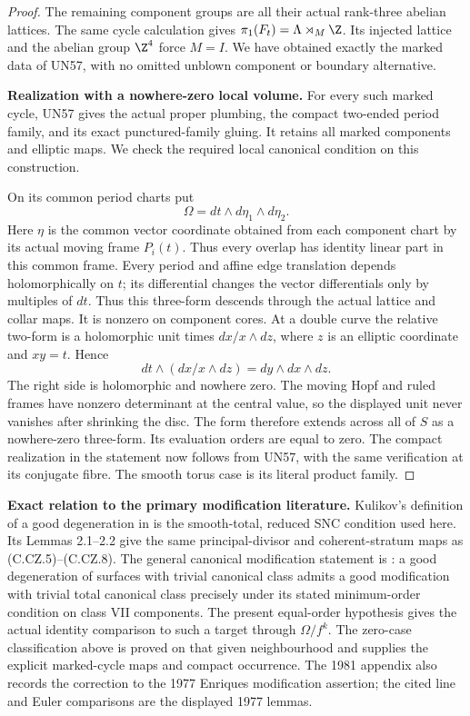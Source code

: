 \begin{proof}
The remaining component groups
are all their actual rank-three
abelian lattices. The same cycle
calculation gives
$\pi_1(F_t)=\Lambda\rtimes_M\Z$.
Its injected lattice and the
abelian group $\Z^4$ force
$M=I$. We have obtained exactly
the marked data of UN57, with
no omitted unblown component
or boundary alternative.

\par\medskip\noindent\textbf{Realization with a nowhere-zero local volume.}
For every such marked cycle,
UN57 gives the actual proper
plumbing, the compact two-ended
period family, and its exact
punctured-family gluing. It
retains all marked components
and elliptic maps. We check
the required local canonical
condition on this construction.

On its common period charts
put
\[
                       \Omega=dt\wedge d\eta_1\wedge d\eta_2.
\tag{C.CZ.13}
\]
Here $\eta$ is the common
vector coordinate obtained
from each component chart
by its actual moving frame
$P_i(t)$. Thus every overlap
has identity linear part in
this common frame.
Every period and affine edge
translation depends holomorphically
on $t$; its differential changes
the vector differentials only by
multiples of $dt$. Thus this
three-form descends through the
actual lattice and collar maps.
It is nonzero on component cores.
At a double curve the relative
two-form is a holomorphic unit
times $dx/x\wedge dz$, where
$z$ is an elliptic coordinate
and $xy=t$. Hence
\[
             dt\wedge(dx/x\wedge dz)
                               =dy\wedge dx\wedge dz.
\tag{C.CZ.14}
\]
The right side is holomorphic
and nowhere zero. The moving
Hopf and ruled frames have
nonzero determinant at the
central value, so the displayed
unit never vanishes after
shrinking the disc. The form
therefore extends across all
of $S$ as a nowhere-zero
three-form. Its evaluation
orders are equal to zero.
The compact realization in
the statement now follows
from UN57, with the same
verification at its conjugate
fibre. The smooth torus case
is its literal product family.
\end{proof}

\par\medskip\noindent\textbf{Exact relation to the primary modification literature.}
Kulikov's definition of a good degeneration in
\cite[p.~958]{Kulikov1977} is the smooth-total,
reduced SNC condition used here. Its Lemmas 2.1--2.2
give the same principal-divisor and coherent-stratum
maps as (C.CZ.5)--(C.CZ.8). The general canonical
modification statement is
\cite[Theorem 1$'$]{Kulikov1981}: a good degeneration
of surfaces with trivial canonical class admits a
good modification with trivial total canonical
class precisely under its stated minimum-order
condition on class VII components. The present
equal-order hypothesis gives the actual identity
comparison to such a target through $\Omega/f^k$.
The zero-case classification above is proved on
that given neighbourhood and supplies the explicit
marked-cycle maps and compact occurrence. The
1981 appendix also records the correction to the
1977 Enriques modification assertion; the cited
line and Euler comparisons are the displayed
1977 lemmas.

